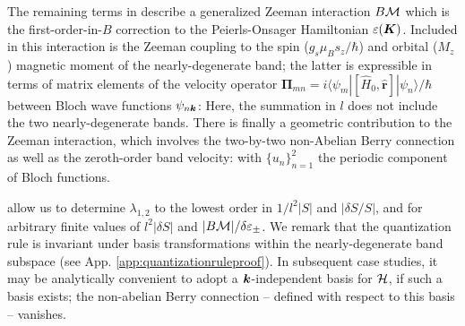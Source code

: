 \documentclass[aps, showpacs, twocolumn, notitlepage, superscriptaddress]{revtex4-1}
\begin{document}
The remaining terms in  describe a generalized Zeeman interaction $B{\cal M}$ which is the first-order-in-$B$ correction to the Peierls-Onsager Hamiltonian $\varepsilon(\boldsymbol{K})$\cite{rotheffham,blount_effham,kohn_effham}. Included in this interaction is the Zeeman coupling to the spin ($g_s\mu_Bs_z/\hbar$) and orbital ($M_z$) magnetic moment\cite{thonhauser_orbital_2005} of the nearly-degenerate band; the latter is expressible in terms of matrix elements of the velocity operator $\boldsymbol{\Pi}_{mn}=i\langle\psi_m|[\hat{H}_0, \hat{\boldsymbol{r}}]|\psi_n\rangle/\hbar$ between Bloch wave functions $\psi_{n\boldsymbol{k}}$:
Here, the summation in $l$ does not include the two nearly-degenerate bands.  There is finally a geometric contribution to the Zeeman interaction, which involves the two-by-two non-Abelian Berry connection\cite{berry_quantal_1984,wilczek_appearance_1984} as well as the  zeroth-order band velocity: 
with $\{u_n\}_{n=1}^2$ the periodic component of Bloch functions. 

 allow us to determine $\lambda_{1,2}$ to the lowest order  in $1/l^2|S|$ and $|\delta S/S|$, and for arbitrary finite values of $l^2|\delta S|$ and $|B{\cal M}|/\delta \varepsilon_{\pm}$. We remark that the quantization rule is invariant under basis transformations within the nearly-degenerate band subspace (see App. \ref{app:quantizationruleproof}).  In subsequent case studies, it may be analytically convenient to adopt a $\boldsymbol{k}$-independent basis for ${\cal H}$, if such a basis exists; the non-abelian Berry connection -- defined with respect to this basis -- vanishes.


\end{document}
